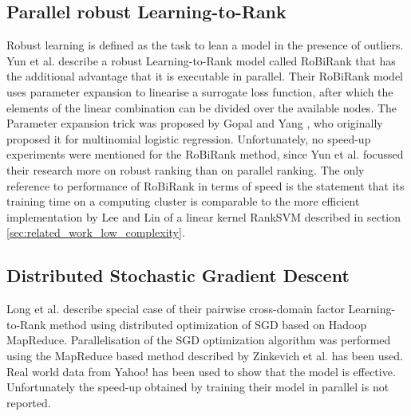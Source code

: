 \subsection{Parallel robust Learning-to-Rank}
Robust learning \cite{Huber1981} is defined as the task to lean a model in the presence of outliers. Yun et al. describe a \cite{Yun2014} robust Learning-to-Rank model called RoBiRank that has the additional advantage that it is executable in parallel. Their RoBiRank model uses parameter expansion to linearise a surrogate loss function, after which the elements of the linear combination can be divided over the available nodes. The Parameter expansion trick was proposed by Gopal and Yang \cite{Gopal2013}, who originally proposed it for multinomial logistic regression. Unfortunately, no speed-up experiments were mentioned for the RoBiRank method, since Yun et al. focussed their research more on robust ranking than on parallel ranking. The only reference to performance of RoBiRank in terms of speed is the statement that its training time on a computing cluster is comparable to the more efficient implementation by Lee and Lin \cite{Lee2014} of a linear kernel RankSVM \cite{Herbrich1999, Joachims2002} described in section \ref{sec:related_work_low_complexity}.
\subsection{Distributed Stochastic Gradient Descent}
Long et al. \cite{Long2012} describe special case of their pairwise cross-domain factor Learning-to-Rank method using distributed optimization of \ac{SGD} based on Hadoop MapReduce. Parallelisation of the \ac{SGD} optimization algorithm was performed using the MapReduce based method described by  Zinkevich et al. \cite{Zinkevich2010} has been used. Real world data from Yahoo! has been used to show that the model is effective. Unfortunately the speed-up obtained by training their model in parallel is not reported.\\

